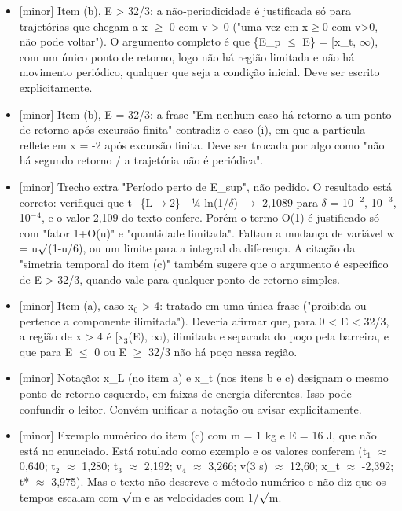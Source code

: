 \documentclass{article}%
\begin{document}
\begin{itemize}%
\item%
{[}minor{]} Item (b), E > 32/3: a não{-}periodicidade é justificada só para trajetórias que chegam a x $\geq$ 0 com v > 0 ("uma vez em x$\geq$0 com v>0, não pode voltar"). O argumento completo é que \{E\_p $\leq$ E\} = {[}x\_t, $\infty$), com um único ponto de retorno, logo não há região limitada e não há movimento periódico, qualquer que seja a condição inicial. Deve ser escrito explicitamente.%
\item%
{[}minor{]} Item (b), E = 32/3: a frase "Em nenhum caso há retorno a um ponto de retorno após excursão finita" contradiz o caso (i), em que a partícula reflete em x = -2 após excursão finita. Deve ser trocada por algo como "não há segundo retorno / a trajetória não é periódica".%
\item%
{[}minor{]} Trecho extra "Período perto de E\_sup", não pedido. O resultado está correto: verifiquei que t\_\{L$\to$2\} - ¼ ln(1/$\delta$) $\to$ 2,1089 para $\delta$ = 10$^{-}$$^2$, 10$^{-}$$^3$, 10$^{-}$$^{4}$, e o valor 2,109 do texto confere. Porém o termo O(1) é justificado só com "fator 1+O(u)" e "quantidade limitada". Faltam a mudança de variável w = u$\surd$(1-u/6), ou um limite para a integral da diferença. A citação da "simetria temporal do item (c)" também sugere que o argumento é específico de E > 32/3, quando vale para qualquer ponto de retorno simples.%
\item%
{[}minor{]} Item (a), caso x$_{0}$ > 4: tratado em uma única frase ("proibida ou pertence a componente ilimitada"). Deveria afirmar que, para 0 < E < 32/3, a região de x > 4 é {[}x$_{3}$(E), $\infty$), ilimitada e separada do poço pela barreira, e que para E $\leq$ 0 ou E $\geq$ 32/3 não há poço nessa região.%
\item%
{[}minor{]} Notação: x\_L (no item a) e x\_t (nos itens b e c) designam o mesmo ponto de retorno esquerdo, em faixas de energia diferentes. Isso pode confundir o leitor. Convém unificar a notação ou avisar explicitamente.%
\item%
{[}minor{]} Exemplo numérico do item (c) com m = 1 kg e E = 16 J, que não está no enunciado. Está rotulado como exemplo e os valores conferem (t$_{1}$ $\approx$ 0,640; t$_{2}$ $\approx$ 1,280; t$_{3}$ $\approx$ 2,192; v$_{4}$ $\approx$ 3,266; v(3 s) $\approx$ 12,60; x\_t $\approx$ -2,392; t* $\approx$ 3,975). Mas o texto não descreve o método numérico e não diz que os tempos escalam com $\surd$m e as velocidades com 1/$\surd$m.%
\end{itemize}%
\end{document}
